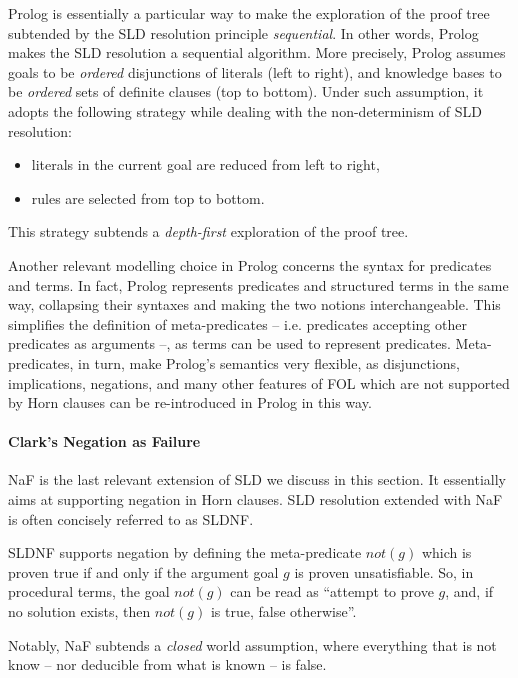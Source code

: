\documentclass[12pt,a4paper,openright,twoside]{book}
\begin{document}
Prolog is essentially a particular way to make the exploration of the proof tree subtended by the SLD resolution principle \emph{sequential}.
%
In other words, Prolog makes the SLD resolution a sequential algorithm.
%
More precisely, Prolog assumes goals to be \emph{ordered} disjunctions of literals (left to right), and knowledge bases to be \emph{ordered} sets of definite clauses (top to bottom).
%
Under such assumption, it adopts the following strategy while dealing with the non-determinism of SLD resolution:
%
\begin{itemize}
    \item literals in the current goal are reduced from left to right,
    \item rules are selected from top to bottom.
\end{itemize}
%
This strategy subtends a \emph{depth-first} exploration of the proof tree.

Another relevant modelling choice in Prolog concerns the syntax for predicates and terms.
%
In fact, Prolog represents predicates and structured terms in the same way, collapsing their syntaxes and making the two notions interchangeable.
%
This simplifies the definition of meta-predicates -- i.e. predicates accepting other predicates as arguments --, as terms can be used to represent predicates.
%
Meta-predicates, in turn, make Prolog's semantics very flexible, as disjunctions, implications, negations, and many other features of FOL which are not supported by Horn clauses can be re-introduced in Prolog in this way.

\paragraph{Clark's Negation as Failure}

NaF \cite{Clark77} is the last relevant extension of SLD we discuss in this section.
%
It essentially aims at supporting negation in Horn clauses.
%
SLD resolution extended with NaF is often concisely referred to as SLDNF.

SLDNF supports negation by defining the meta-predicate $not(g)$ which is proven true if and only if the argument goal $g$ is proven unsatisfiable.
%
So, in procedural terms, the goal $not(g)$ can be read as ``attempt to prove $g$, and, if no solution exists, then $not(g)$ is true, false otherwise''.

Notably, NaF subtends a \emph{closed} world assumption, where everything that is not know -- nor deducible from what is known -- is false.
\end{document}
